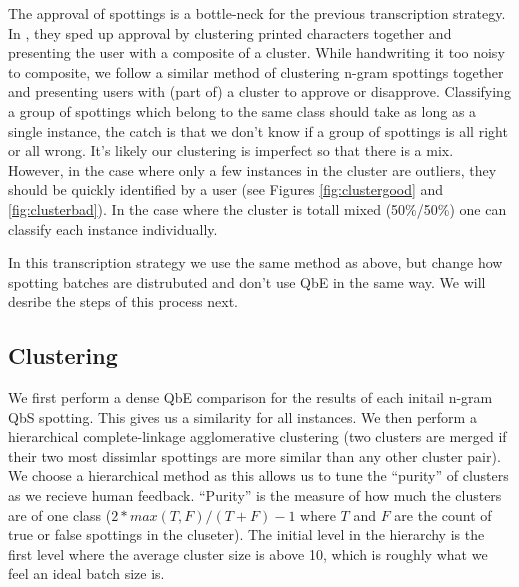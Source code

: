 \documentclass[ms,electronic,twosidetoc,letterpaper,chaptercenter,parttop,lol,lof,lot]{byumsphd}
\begin{document}
The approval of spottings is a bottle-neck for the previous transcription strategy. In \cite{Retsinas2015}, they sped up approval by clustering printed characters together and presenting the user with a composite of a cluster. While handwriting it too noisy to composite, we follow a similar method of clustering n-gram spottings together and presenting users with (part of) a cluster to approve or disapprove. Classifying a group of spottings which belong to the same class should take as long as a single instance, the catch is that we don't know if a group of spottings is all right or all wrong. It's likely our clustering is imperfect so that there is a mix. However, in the case where only a few instances in the cluster are outliers, they should be quickly identified by a user (see Figures \ref{fig:clustergood} and \ref{fig:clusterbad}). In the case where the cluster is totall mixed (50\%/50\%) one can classify each instance individually.%

In this transcription strategy we use the same method as above, but change how spotting batches are distrubuted and don't use QbE in the same way. We will desribe the steps of this process next.

\subsection{Clustering}

We first perform a dense QbE comparison for the results of each initail n-gram QbS spotting. This gives us a similarity for all instances. We then perform a hierarchical complete-linkage agglomerative clustering (two clusters are merged if their two most dissimlar spottings are more similar than any other cluster pair). We choose a hierarchical method as this allows us to tune the ``purity'' of clusters as we recieve human feedback. ``Purity'' is the measure of how much the clusters are of one class ($2*max(T,F)/(T+F)-1$ where $T$ and $F$ are the count of true or false spottings in the cluseter). The initial level in the hierarchy is the first level where the average cluster size is above 10, which is roughly what we feel an ideal batch size is.
\end{document}
